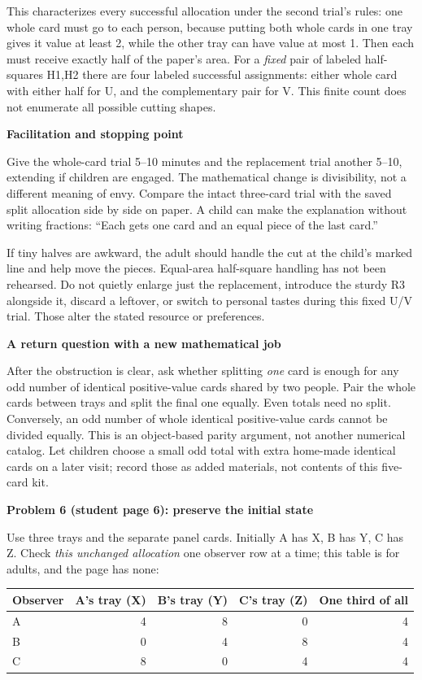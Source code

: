 \documentclass[11pt]{article}
\newcommand{\heading}[1]{\par\vspace{1.5mm}{\large\bfseries #1}\par\vspace{.8mm}}
\newcommand{\subhead}[1]{\par\vspace{1mm}\textbf{#1}\par}
\newcommand{\page}[1]{\newpage\heading{#1}}
\begin{document}
This characterizes every successful allocation under the second trial's rules: one whole card must go to each person, because putting both whole cards in one tray gives it value at least 2, while the other tray can have value at most 1. Then each must receive exactly half of the paper's area. For a \emph{fixed} pair of labeled half-squares H1,H2 there are four labeled successful assignments: either whole card with either half for U, and the complementary pair for V. This finite count does not enumerate all possible cutting shapes.

\subhead{Facilitation and stopping point}
Give the whole-card trial 5--10 minutes and the replacement trial another 5--10, extending if children are engaged. The mathematical change is divisibility, not a different meaning of envy. Compare the intact three-card trial with the saved split allocation side by side on paper. A child can make the explanation without writing fractions: ``Each gets one card and an equal piece of the last card.''

If tiny halves are awkward, the adult should handle the cut at the child's marked line and help move the pieces. Equal-area half-square handling has not been rehearsed. Do not quietly enlarge just the replacement, introduce the sturdy R3 alongside it, discard a leftover, or switch to personal tastes during this fixed U/V trial. Those alter the stated resource or preferences.

\subhead{A return question with a new mathematical job}
After the obstruction is clear, ask whether splitting \emph{one} card is enough for any odd number of identical positive-value cards shared by two people. Pair the whole cards between trays and split the final one equally. Even totals need no split. Conversely, an odd number of whole identical positive-value cards cannot be divided equally. This is an object-based parity argument, not another numerical catalog. Let children choose a small odd total with extra home-made identical cards on a later visit; record those as added materials, not contents of this five-card kit.

\page{Problems 6 and 7: three people and general claims}
\subhead{Problem 6 (student page 6): preserve the initial state}
Use three trays and the separate panel cards. Initially A has X, B has Y, C has Z. Check \emph{this unchanged allocation} one observer row at a time; this table is for adults, and the page has none:

\begin{center}
\begin{tabular}{@{}lrrrr@{}}\toprule
Observer & A's tray (X) & B's tray (Y) & C's tray (Z) & One third of all\\\midrule
A & 4 & 8 & 0 & 4\\
B & 0 & 4 & 8 & 4\\
C & 8 & 0 & 4 & 4\\\bottomrule
\end{tabular}
\end{center}
\end{document}
